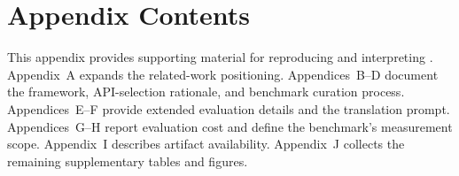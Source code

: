 


% 

\newpage

\clearpage
{}


\clearpage
{}
\section*{Appendix Contents}
\label{sec:appendix-contents}

This appendix provides supporting material for reproducing and interpreting \parbench{}. Appendix~A expands the related-work positioning. Appendices~B--D document the framework, API-selection rationale, and benchmark curation process. 
Appendices~E--F provide extended evaluation details and the translation prompt. Appendices~G--H report evaluation cost and define the benchmark's measurement scope. Appendix~I describes artifact availability. Appendix~J collects the remaining supplementary tables and figures.

\vspace{0.75em}

